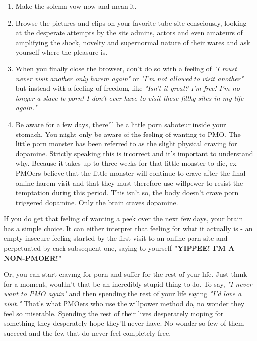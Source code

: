 \documentclass[easypeasy.tex]{subfiles}
\begin{document}
\begin{enumerate}
  \item Make the solemn vow now and mean it.

  \item Browse the pictures and clips on your favorite tube site consciously, looking at the desperate attempts by the site admins, actors and even amateurs of amplifying the shock, novelty and supernormal nature of their wares and ask yourself where the pleasure is.

  \item When you finally close the browser, don't do so with a feeling of \textit{"I must never visit another only harem again"} or \textit{"I'm not allowed to visit another"} but instead with a feeling of freedom, like \textit{"Isn't it great? I'm free! I'm no longer a slave to porn! I don't ever have to visit these filthy sites in my life again."}

  \item Be aware for a few days, there'll be a little porn saboteur inside your stomach. You might only be aware of the feeling of wanting to PMO. The little porn monster has been referred to as the slight physical craving for dopamine. Strictly speaking this is incorrect and it's important to understand why. Because it takes up to three weeks for that little monster to die, ex-PMOers believe that the little monster will continue to crave after the final online harem visit and that they must therefore use willpower to resist the temptation during this period. This isn't so, the body doesn't crave porn triggered dopamine. Only the brain craves dopamine.
\end{enumerate}

If you do get that feeling of wanting a peek over the next few days, your brain has a simple choice. It can either interpret that feeling for what it actually is - an empty insecure feeling started by the first visit to an online porn site and perpetuated by each subsequent one, saying to yourself \textbf{"YIPPEE! I'M A NON-PMOER!"}

Or, you can start craving for porn and suffer for the rest of your life. Just think for a moment, wouldn't that be an incredibly stupid thing to do. To say, \textit{"I never want to PMO again"} and then spending the rest of your life saying \textit{"I'd love a visit."} That's what PMOers who use the willpower method do, no wonder they feel so miserable. Spending the rest of their lives desperately moping for something they desperately hope they'll never have. No wonder so few of them succeed and the few that do never feel completely free.
\end{document}
